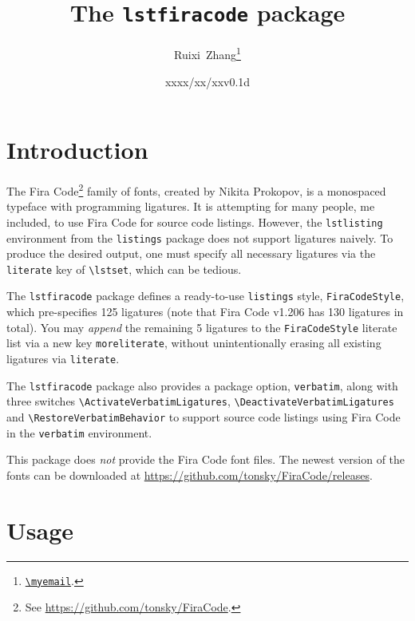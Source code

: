 \documentclass[11pt]{article}
\title{The \texttt{lstfiracode} package}
\author{Ruixi~Zhang\thanks{\href{mailto:\myemail}{\nolinkurl{\myemail}}.}}
\date{xxxx/xx/xx\enskip v0.1d}
\begin{document}
\maketitle

\tableofcontents
{}

\section{Introduction}

The Fira Code\footnote{See \url{https://github.com/tonsky/FiraCode}.} family
of fonts, created by Nikita Prokopov, is a monospaced typeface with
programming ligatures.
It is attempting for many people, me included, to use Fira Code for source
code listings.
However, the \verb|lstlisting| environment from the \verb|listings| package
does not support ligatures naively. To produce the desired output, one must
specify all necessary ligatures via the \verb|literate| key
of \verb|\lstset|, which can be tedious.

The \verb|lstfiracode| package defines a ready-to-use \verb|listings| style,
\verb|FiraCodeStyle|, which pre-specifies 125 ligatures
(note that Fira Code v1.206 has 130 ligatures in total).
You may \emph{append} the remaining 5 ligatures to the \verb|FiraCodeStyle|
literate list via a new key \verb|moreliterate|, without unintentionally
erasing all existing ligatures via \verb|literate|.

The \verb|lstfiracode| package also provides a package option,
\verb|verbatim|, along with three switches
\verb|\ActivateVerbatimLigatures|, \verb|\DeactivateVerbatimLigatures|
and \verb|\RestoreVerbatimBehavior|
to support source code listings using Fira Code
in the \verb|verbatim| environment.

This package does \emph{not} provide the Fira Code font files.
The newest version of the fonts can be downloaded at
\url{https://github.com/tonsky/FiraCode/releases}.

\section{Usage}
\end{document}
